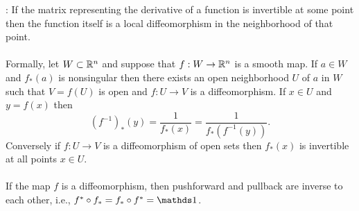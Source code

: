 \documentclass[10pt]{article}
\begin{document}
\begin{definition}
	: If the matrix representing the derivative of a function is invertible at some point then the function itself is a local diffeomorphism in the neighborhood of that point.\\\\
	Formally, let $W \subset \mathbb{R}^n$ and suppose that $f:W\to\mathbb{R}^n$ is a smooth map. If $a\in W$ and $f_*(a)$ is nonsingular then there exists an open neighborhood $U$ of $a$ in $W$ such that $V=f(U)$ is open and $f:U\to V$ is a diffeomorphism. If $x\in U$ and $y=f(x)$ then
	$$
	(f^{-1})_*(y) = \frac{1}{f_*(x)} = \frac{1}{f_*(f^{-1}(y))}.
	$$
	Conversely if $f:U\to V$ is a diffeomorphism of open sets then $f_*(x)$ is invertible at all points $x\in U$.\\\\
	If the map $f$ is a diffeomorphism, then pushforward and pullback are inverse to each other, i.e., $f^* \circ f_* = f_* \circ f^* = \id$.
\end{definition}
\end{document}
